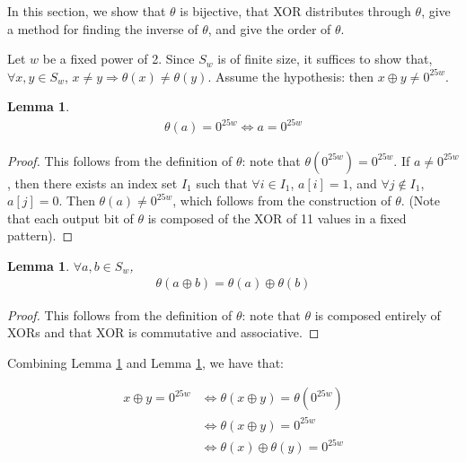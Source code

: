 \documentclass[10pt,twocolumn,twoside]{pnas-new}
\newtheorem{lemma}[theorem]{Lemma}
\begin{document}

In this section, we show that $\theta$ is bijective, that XOR distributes
through $\theta$, give a method for finding the inverse of $\theta$, and
give the order of $\theta$.

Let $w$ be a fixed power of 2. Since $S_{w}$ is of finite size, it suffices to
show that, $\forall x, y \in S_{w}$,
$x \neq y \Rightarrow \theta(x) \neq \theta(y)$. Assume the hypothesis: then
$x \oplus y \neq 0^{25w}$.

\begin{lemma} \label{lem:p:t:1}
\begin{align*}
    \theta(a) = 0^{25w} \iff a = 0^{25w}
\end{align*}
\end{lemma}
\begin{proof}

This follows from the definition of $\theta$: note that
$\theta(0^{25w}) = 0^{25w}$. If $a \neq 0^{25w}$, then there
exists an index set $I_{1}$ such that $\forall i \in I_{1}$, $a[i] = 1$,
and $\forall j \not\in I_{1}$, $a[j] = 0$. Then $\theta(a) \neq 0^{25w}$,
which follows from the construction of $\theta$. (Note that each output
bit of $\theta$ is composed of the XOR of 11 values in a fixed pattern).

\end{proof}

\begin{lemma} \label{lem:p:t:2}
$\forall a, b \in S_{w}$,
\begin{align*}
    \theta(a \oplus b) = \theta(a) \oplus \theta(b)
\end{align*}
\end{lemma}
\begin{proof}

This follows from the definition of $\theta$: note that $\theta$ is
composed entirely of XORs and that XOR is commutative and associative.

\end{proof}


Combining Lemma \ref{lem:p:t:1} and Lemma \ref{lem:p:t:2}, we have that:

\begin{align*}
    x \oplus y = 0^{25w} & \iff \theta(x \oplus y) = \theta(0^{25w}) \\
        & \iff \theta(x \oplus y) = 0^{25w} \\
        & \iff \theta(x) \oplus \theta(y) = 0^{25w}
\end{align*}
\end{document}
